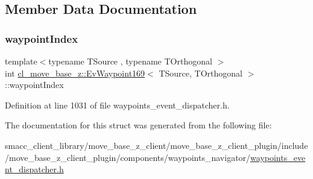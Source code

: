 \subsection{Member Data Documentation}
\mbox{\label{structcl__move__base__z_1_1EvWaypoint169_a3b6af50ccb8417eb44941e157f3fcaa2}} 
\subsubsection{\texorpdfstring{waypoint\+Index}{waypointIndex}}
{\footnotesize\ttfamily template$<$typename T\+Source , typename T\+Orthogonal $>$ \\
int \hyperlink{structcl__move__base__z_1_1EvWaypoint169}{cl\+\_\+move\+\_\+base\+\_\+z\+::\+Ev\+Waypoint169}$<$ T\+Source, T\+Orthogonal $>$\+::waypoint\+Index}



Definition at line 1031 of file waypoints\+\_\+event\+\_\+dispatcher.\+h.



The documentation for this struct was generated from the following file\+:\begin{DoxyCompactItemize}
\item 
smacc\+\_\+client\+\_\+library/move\+\_\+base\+\_\+z\+\_\+client/move\+\_\+base\+\_\+z\+\_\+client\+\_\+plugin/include/move\+\_\+base\+\_\+z\+\_\+client\+\_\+plugin/components/waypoints\+\_\+navigator/\hyperlink{waypoints__event__dispatcher_8h}{waypoints\+\_\+event\+\_\+dispatcher.\+h}\end{DoxyCompactItemize}
